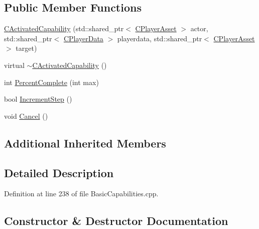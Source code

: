\subsection*{Public Member Functions}
\begin{DoxyCompactItemize}
\item 
\hyperlink{classCPlayerCapabilityStandGround_1_1CActivatedCapability_aedaa8238e1eb01e9762e19ab61795dda}{C\+Activated\+Capability} (std\+::shared\+\_\+ptr$<$ \hyperlink{classCPlayerAsset}{C\+Player\+Asset} $>$ actor, std\+::shared\+\_\+ptr$<$ \hyperlink{classCPlayerData}{C\+Player\+Data} $>$ playerdata, std\+::shared\+\_\+ptr$<$ \hyperlink{classCPlayerAsset}{C\+Player\+Asset} $>$ target)
\item 
virtual \hyperlink{classCPlayerCapabilityStandGround_1_1CActivatedCapability_a7fe4c33b38b30befad569944ded1e402}{$\sim$\+C\+Activated\+Capability} ()
\item 
int \hyperlink{classCPlayerCapabilityStandGround_1_1CActivatedCapability_aa9bf1824e755460b699d81f866f2aadc}{Percent\+Complete} (int max)
\item 
bool \hyperlink{classCPlayerCapabilityStandGround_1_1CActivatedCapability_ab4061171835e4c1008176e5765ded595}{Increment\+Step} ()
\item 
void \hyperlink{classCPlayerCapabilityStandGround_1_1CActivatedCapability_ac75cd8a26726adb60cf045f99059ca7d}{Cancel} ()
\end{DoxyCompactItemize}
\subsection*{Additional Inherited Members}


\subsection{Detailed Description}


Definition at line 238 of file Basic\+Capabilities.\+cpp.



\subsection{Constructor \& Destructor Documentation}
\hypertarget{classCPlayerCapabilityStandGround_1_1CActivatedCapability_aedaa8238e1eb01e9762e19ab61795dda}{}\label{classCPlayerCapabilityStandGround_1_1CActivatedCapability_aedaa8238e1eb01e9762e19ab61795dda} 
